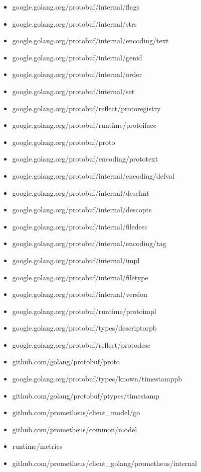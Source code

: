 \begin{itemize}
    \item google.golang.org/protobuf/internal/flags
    \item google.golang.org/protobuf/internal/strs
    \item google.golang.org/protobuf/internal/encoding/text
    \item google.golang.org/protobuf/internal/genid
    \item google.golang.org/protobuf/internal/order
    \item google.golang.org/protobuf/internal/set
    \item google.golang.org/protobuf/reflect/protoregistry
    \item google.golang.org/protobuf/runtime/protoiface
    \item google.golang.org/protobuf/proto
    \item google.golang.org/protobuf/encoding/prototext
    \item google.golang.org/protobuf/internal/encoding/defval
    \item google.golang.org/protobuf/internal/descfmt
    \item google.golang.org/protobuf/internal/descopts
    \item google.golang.org/protobuf/internal/filedesc
    \item google.golang.org/protobuf/internal/encoding/tag
    \item google.golang.org/protobuf/internal/impl
    \item google.golang.org/protobuf/internal/filetype
    \item google.golang.org/protobuf/internal/version
    \item google.golang.org/protobuf/runtime/protoimpl
    \item google.golang.org/protobuf/types/descriptorpb
    \item google.golang.org/protobuf/reflect/protodesc
    \item github.com/golang/protobuf/proto
    \item google.golang.org/protobuf/types/known/timestamppb
    \item github.com/golang/protobuf/ptypes/timestamp
    \item github.com/prometheus/client\_model/go
    \item github.com/prometheus/common/model
    \item runtime/metrics
    \item github.com/prometheus/client\_golang/prometheus/internal

\end{itemize}
